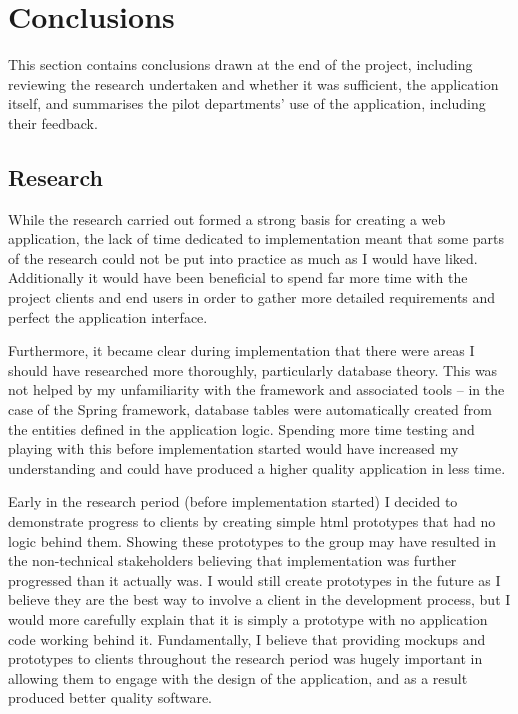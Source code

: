 
\section{Conclusions}
\label{sec:conclusions}

This section contains conclusions drawn at the end of the project, including
reviewing the research undertaken and whether it was sufficient, the
application itself, and summarises the pilot departments' use of the
application, including their feedback.



\subsection{Research}

While the research carried out formed a strong basis for creating a web
application, the lack of time dedicated to implementation meant that some
parts of the research could not be put into practice as much as I would have
liked. Additionally it would have been beneficial to spend far more time with
the project clients and end users in order to gather more detailed
requirements and perfect the application interface.

Furthermore, it became clear during implementation that there were areas I
should have researched more thoroughly, particularly database theory. This was
not helped by my unfamiliarity with the framework and associated tools -- in
the case of the Spring framework, database tables were automatically created
from the entities defined in the application logic. Spending more time testing
and playing with this before implementation started would have increased my
understanding and could have produced a higher quality application in less
time.

Early in the research period (before implementation started) I decided to
demonstrate progress to clients by creating simple \gls{html} prototypes that
had no logic behind them. Showing these prototypes to the group may have
resulted in the non-technical stakeholders believing that implementation was
further progressed than it actually was. I would still create prototypes in
the future as I believe they are the best way to involve a client in the
development process, but I would more carefully explain that it is simply a
prototype with no application code working behind it. Fundamentally, I believe
that providing mockups and prototypes to clients throughout the research
period was hugely important in allowing them to engage with the design of the
application, and as a result produced better quality software.

